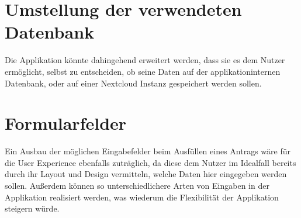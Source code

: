 \section{Umstellung der verwendeten Datenbank}\label{umstellung der verwendeten datenbank}
Die Applikation könnte dahingehend erweitert werden, dass sie es dem Nutzer ermöglicht, 
selbst zu entscheiden, ob seine Daten auf der applikationinternen Datenbank, oder auf einer 
Nextcloud Instanz gespeichert werden sollen. 


\section{Formularfelder}\label{sec: formularfelder}
Ein Ausbau der möglichen Eingabefelder beim Ausfüllen eines Antrags wäre für die
User Experience ebenfalls zuträglich, da diese dem Nutzer im Idealfall bereits durch ihr
Layout und Design vermitteln, welche Daten hier eingegeben werden sollen. Außerdem können
so unterschiedlichere Arten von Eingaben in der Applikation realisiert werden, was wiederum
die Flexibilität der Applikation steigern würde.